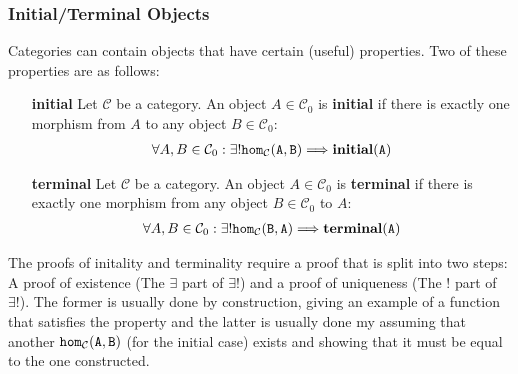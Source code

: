 \subsubsection{Initial/Terminal Objects}
Categories can contain objects that have certain (useful) properties.
Two of these properties are as follows:
\begin{itemize}
    \item[\textbf{initial}]  Let $\mathcal{C}$ be a category. An object $A\in\mathcal{C}_0$ is \textbf{initial} if there is exactly one morphism from $A$ to any object $B\in\mathcal{C}_0$: 
    \begin{align*}
        \forall A,B\in\mathcal{C}_0: \exists! \tt{hom}_\mathcal{C}(A,B) \Longrightarrow \textbf{initial}(A)
    \end{align*}
    \item[\textbf{terminal}]  Let $\mathcal{C}$ be a category. An object $A\in\mathcal{C}_0$ is \textbf{terminal} if there is exactly one morphism from any object $B\in\mathcal{C}_0$ to $A$:
    \begin{align*}
        \forall A,B\in\mathcal{C}_0: \exists! \tt{hom}_\mathcal{C}(B,A) \Longrightarrow \textbf{terminal}(A)
    \end{align*}
\end{itemize}
The proofs of initality and terminality require a proof that is split into two steps: A proof of existence (The $\exists$ part of $\exists!$) and a proof of uniqueness (The $!$ part of $\exists!$).
The former is usually done by construction, giving an example of a function that satisfies the property and the latter is usually done my assuming that another $\tt{hom}_\mathcal{C}(A,B)$ (for the initial case) exists and showing that it must be equal to the one constructed.

